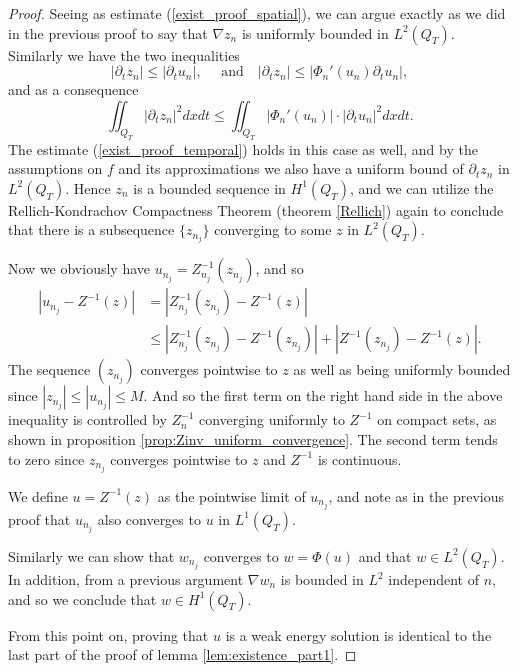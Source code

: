 \documentclass[11pt, a4paper]{article}
\begin{document}
\begin{proof}
Seeing as estimate (\ref{exist_proof_spatial}), we can argue exactly as we did in the previous proof to say that $\nabla z_n$ is uniformly bounded in $L^2(Q_T)$.
Similarly we have the two inequalities
\begin{equation*}
|\partial_t z_n | \leq |\partial_t u_n|, \quad \text{ and} \quad |\partial_t z_n| \leq |\Phi_n'(u_n) \partial_t u_n|,
\end{equation*}
and as a consequence
\begin{equation*}
\iint_{Q_T}|\partial_t z_n|^2 dxdt \leq \iint_{Q_T} |\Phi_n'(u_n)|\cdot |\partial_t u_n|^2dxdt.
\end{equation*}
The estimate (\ref{exist_proof_temporal}) holds in this case as well, and by the assumptions on $f$ and its approximations we also have a uniform bound of $\partial_t z_n$ in $L^2(Q_T)$. Hence $z_n$ is a bounded sequence in $H^1(Q_T)$, and we can utilize the Rellich-Kondrachov Compactness Theorem (theorem \ref{Rellich}) again to conclude that there is a subsequence $\{z_{n_j}\}$ converging to some $z$ in $L^2(Q_T)$.

Now we obviously have $u_{n_j} = Z_{n_j}^{-1}(z_{n_j})$, and so
\begin{align*}
|u_{n_j} - Z^{-1}(z)| &= |Z_{n_j}^{-1}(z_{n_j}) - Z^{-1}(z)| \\
&\leq |Z_{n_j}^{-1}(z_{n_j}) - Z^{-1}(z_{n_j})| + |Z^{-1}(z_{n_j})- Z^{-1}(z)|.
\end{align*}
The sequence $(z_{n_j})$ converges pointwise to $z$ as well as being uniformly bounded 
since $|z_{n_j}| \leq |u_{n_j}| \leq M$. And so the first term on the right hand side in the above inequality is controlled by $Z_n^{-1}$ converging uniformly to $Z^{-1}$ on compact sets, as shown in proposition \ref{prop:Zinv_uniform_convergence}. The second term tends to zero since $z_{n_j}$ converges pointwise to $z$ and $Z^{-1}$ is continuous.

We define $u=Z^{-1}(z)$ as the pointwise limit of $u_{n_j}$, and note as in the previous proof that $u_{n_j}$ also converges to $u$ in $L^1(Q_T)$.

Similarly we can show that $w_{n_j}$ converges to $w=\Phi(u)$ and that $w \in L^2(Q_T)$.
In addition, from a previous argument $\nabla w_n$ is bounded in $L^2$ independent of $n$, and so we conclude that $w \in H^1(Q_T)$.

From this point on, proving that $u$ is a weak energy solution is identical to the last part of the proof of lemma \ref{lem:existence_part1}.
\end{proof}
\end{document}

